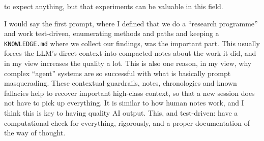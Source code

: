\documentclass[11pt,a4paper]{article}
\newcommand{\file}[1]{\texttt{#1}}
\begin{document}
\begin{description}[leftmargin=1.2em,itemsep=4pt,font=\normalfont\itshape]
to expect anything, but that experiments can be valuable in this field.
\item[Q4, guardrails.] I would say the first prompt, where I defined that we do a ``research programme'' and work
test-driven, enumerating methods and paths and keeping a \file{KNOWLEDGE.md} where we collect our findings, was the
important part. This usually forces the LLM's direct context into compacted notes about the work it did, and in my
view increases the quality a lot. This is also one reason, in my view, why complex ``agent'' systems are so
successful with what is basically prompt masquerading. These contextual guardrails, notes, chronologies and known
fallacies help to recover important high-class context, so that a new session does not have to pick up everything.
It is similar to how human notes work, and I think this is key to having quality AI output. This, and test-driven:
have a computational check for everything, rigorously, and a proper documentation of the way of thought.


\end{description}
\end{document}
